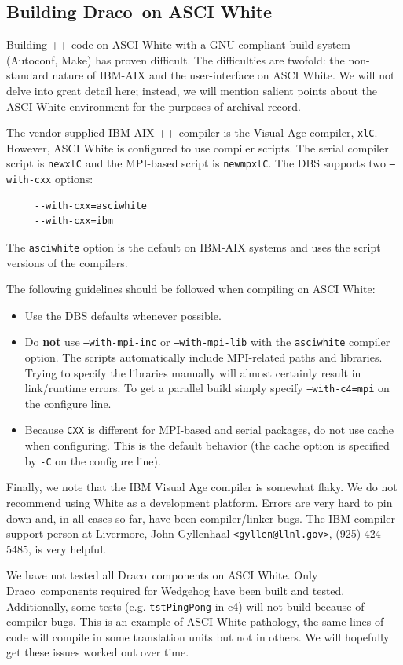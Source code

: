 \documentclass[11pt]{nmemo}
\newcommand{\draco}{Draco}
\newcommand{\autoconf}{\textsf{Autoconf}}
\newcommand{\make}{\textsf{Make}}
\begin{document}
\subsection{Building \draco\ on ASCI White}

Building \C++ code on ASCI White with a GNU-compliant build system
(\autoconf, \make) has proven difficult.  The difficulties are
twofold: the non-standard nature of IBM-AIX and the user-interface on
ASCI White.  We will not delve into great detail here; instead, we
will mention salient points about the ASCI White environment for the
purposes of archival record.

The vendor supplied IBM-AIX \C++ compiler is the Visual Age compiler, 
\texttt{xlC}.  However, ASCI White is configured to use compiler
scripts.  The serial compiler script is \texttt{newxlC} and the
MPI-based script is \texttt{newmpxlC}.  The DBS supports two
\texttt{--with-cxx} options:
\begin{verbatim}
     --with-cxx=asciwhite
     --with-cxx=ibm
\end{verbatim}
The \texttt{asciwhite} option is the default on IBM-AIX systems and
uses the script versions of the compilers. 

The following guidelines should be followed when compiling on ASCI
White:
\begin{itemize}
\item Use the DBS defaults whenever possible.
\item Do {\bf not} use \texttt{--with-mpi-inc} or
  \texttt{--with-mpi-lib} with the \texttt{asciwhite} compiler
  option.  The scripts automatically include MPI-related paths and
  libraries.  Trying to specify the libraries manually will almost
  certainly result in link/runtime errors.  To get a parallel build
  simply specify \texttt{--with-c4=mpi} on the configure line.
\item Because \texttt{CXX} is different for MPI-based and serial
  packages, do not use cache when configuring.  This is the default
  behavior (the cache option is specified by \texttt{-C} on the
  configure line).
\end{itemize}
Finally, we note that the IBM Visual Age compiler is somewhat flaky.
We do not recommend using White as a development platform.  Errors are
very hard to pin down and, in all cases so far, have been
compiler/linker bugs.  The IBM compiler support person at Livermore,
John Gyllenhaal \texttt{<gyllen@llnl.gov>}, (925) 424-5485, is very
helpful.

We have not tested all \draco\ components on ASCI White.  Only \draco\
components required for Wedgehog have been built and tested.
Additionally, some tests (e.g. \texttt{tstPingPong} in c4) will not
build because of compiler bugs.  This is an example of ASCI White
pathology, the same lines of code will compile in some translation
units but not in others.  We will hopefully get these issues worked
out over time.
\end{document}
